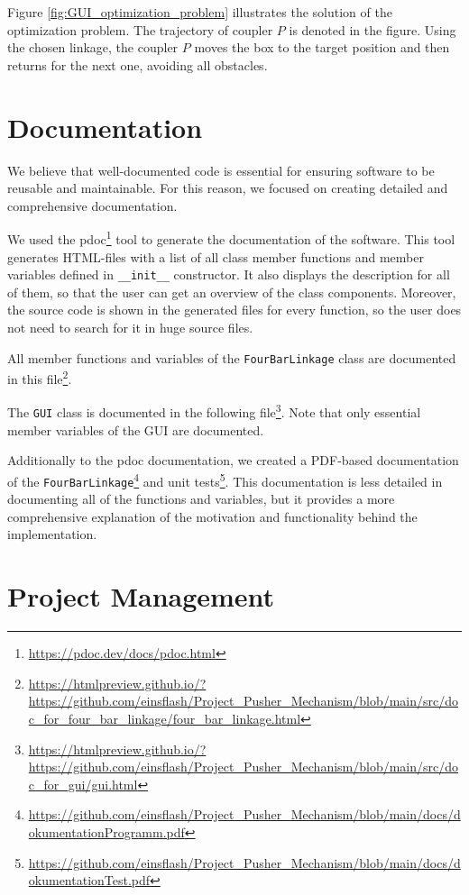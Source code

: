 \documentclass{article}
\begin{document}
Figure \ref{fig:GUI_optimization_problem} illustrates the solution of the optimization problem. The trajectory of coupler $P$ is denoted in the figure. Using the chosen linkage, the coupler $P$ moves the box to the target position and then returns for the next one, avoiding all obstacles.

\section{Documentation}\label{ch:doc}

We believe that well-documented code is essential for ensuring software to be reusable and maintainable. For this reason, we focused on creating detailed and comprehensive documentation.

We used the pdoc\footnote{\url{https://pdoc.dev/docs/pdoc.html}} tool to generate the documentation of the software. This tool generates HTML-files with a list of all class member functions and member variables defined in \texttt{\_\_init\_\_} constructor. It also displays the description for all of them, so that the user can get an overview of the class components. Moreover, the source code is shown in the generated files for every function, so the user does not need to search for it in huge source files. 

All member functions and variables of the \texttt{FourBarLinkage} class are documented in this file\footnote{\url{https://htmlpreview.github.io/?https://github.com/einsflash/Project_Pusher_Mechanism/blob/main/src/doc_for_four_bar_linkage/four_bar_linkage.html}}.

The \texttt{GUI} class is documented in the following file\footnote{\url{https://htmlpreview.github.io/?https://github.com/einsflash/Project_Pusher_Mechanism/blob/main/src/doc_for_gui/gui.html}}. Note that only essential member variables of the GUI are documented.

Additionally to the pdoc documentation, we created a PDF-based documentation of the \texttt{FourBarLinkage}\footnote{\url{https://github.com/einsflash/Project_Pusher_Mechanism/blob/main/docs/dokumentationProgramm.pdf}} and unit tests\footnote{\url{https://github.com/einsflash/Project_Pusher_Mechanism/blob/main/docs/dokumentationTest.pdf}}. This documentation is less detailed in documenting all of the functions and variables, but it provides a more comprehensive explanation of the motivation and functionality behind the implementation.


\section{Project Management} \label{ch:projectmanagement}
\end{document}
